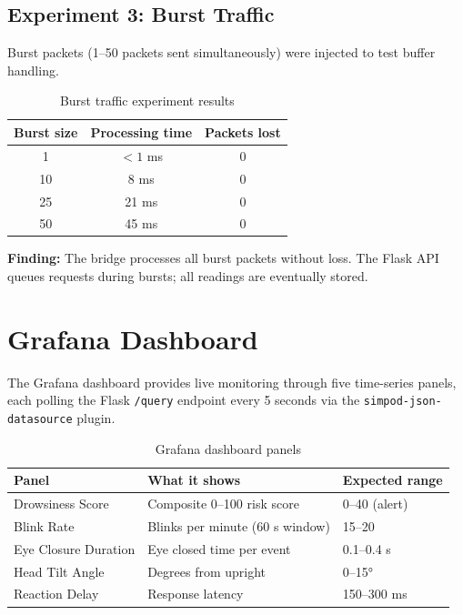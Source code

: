\documentclass[12pt, a4paper]{article}
\begin{document}
\subsection{Experiment 3: Burst Traffic}

Burst packets (1--50 packets sent simultaneously) were injected to test
buffer handling.

\begin{table}[H]
\centering
\caption{Burst traffic experiment results}
\begin{tabular}{ccc}
\toprule
\textbf{Burst size} & \textbf{Processing time} & \textbf{Packets lost} \\
\midrule
1   & $<1$ ms  & 0 \\
10  & 8 ms     & 0 \\
25  & 21 ms    & 0 \\
50  & 45 ms    & 0 \\
\bottomrule
\end{tabular}
\end{table}

\textbf{Finding:} The bridge processes all burst packets without loss. The
Flask API queues requests during bursts; all readings are eventually stored.

\section{Grafana Dashboard}
\label{sec:grafana}

The Grafana dashboard provides live monitoring through five time-series panels,
each polling the Flask \texttt{/query} endpoint every 5 seconds via the
\texttt{simpod-json-datasource} plugin.

\begin{table}[H]
\centering
\caption{Grafana dashboard panels}
\begin{tabularx}{\textwidth}{lXl}
\toprule
\textbf{Panel} & \textbf{What it shows} & \textbf{Expected range} \\
\midrule
Drowsiness Score      & Composite 0--100 risk score & 0--40 (alert) \\
Blink Rate            & Blinks per minute (60 s window) & 15--20 \\
Eye Closure Duration  & Eye closed time per event & 0.1--0.4 s \\
Head Tilt Angle       & Degrees from upright & 0--15° \\
Reaction Delay        & Response latency & 150--300 ms \\
\bottomrule
\end{tabularx}
\end{table}
\end{document}

